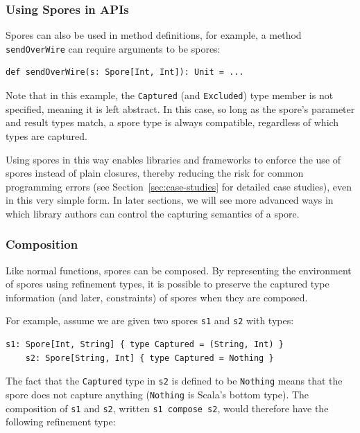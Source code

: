 \documentclass{llncs}
\begin{document}
\subsubsection{Using Spores in APIs}

Spores can also be used in method definitions, for example, a method \verb|sendOverWire| can require arguments to be spores:

\begin{lstlisting}[numbers=none]
    def sendOverWire(s: Spore[Int, Int]): Unit = ...
\end{lstlisting}

\noindent Note that in this example, the \verb|Captured| (and \verb|Excluded|) type
member is not specified, meaning it is left abstract. In this case, so long as
the spore's parameter and result types match, a spore type is always
compatible, regardless of which types are captured.

Using spores in this way enables libraries and frameworks to enforce the use
of spores instead of plain closures, thereby reducing the risk for common
programming errors (see Section~\ref{sec:case-studies} for detailed case
studies), even in this very simple form. In later sections, we will see more
advanced ways in which library authors can control the capturing semantics of
a spore.

\subsubsection{Composition}

Like normal functions, spores can be composed. By representing the environment
of spores using refinement types, it is possible to preserve the captured type
information (and later, constraints) of spores when they are composed.

For example, assume we are given two spores \verb|s1| and \verb|s2| with types:

\begin{lstlisting}[numbers=none]
    s1: Spore[Int, String] { type Captured = (String, Int) }
    s2: Spore[String, Int] { type Captured = Nothing }
\end{lstlisting}

\noindent The fact that the \verb|Captured| type in \verb|s2| is defined to be
\verb|Nothing| means that the spore does not capture anything (\verb|Nothing|
is Scala's bottom type). The composition of \verb|s1| and \verb|s2|, written
\verb|s1 compose s2|, would therefore have the following refinement type:
\end{document}
